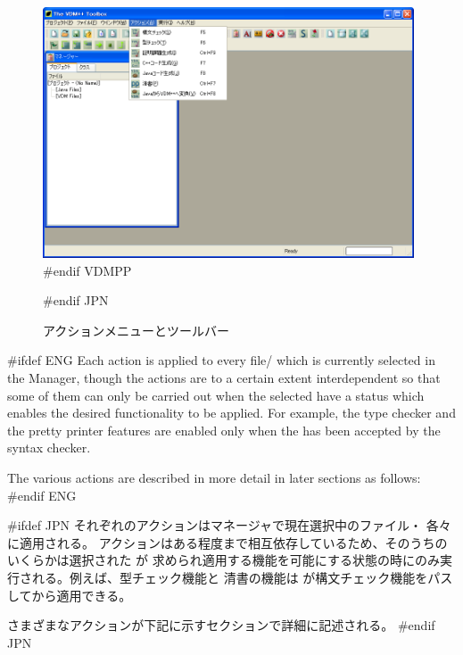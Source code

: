 \documentclass[\pformat,12pt]{article}
\newcommand{\guicmd}[1]{{\sf #1}}
\newcommand{\guicmd}[1]{{\gt #1}}
\begin{document}
\begin{figure}[tbh]
\begin{center}
\includegraphics[width=11cm]{actionsMenuToolbar-pp.png}
#endif VDMPP
\caption{アクションメニューとツールバー}
#endif JPN
\label{fig:actionsMenuToolbar}
\end{center}
\end{figure}

#ifdef ENG
Each action is applied to every
file/ which is currently
selected in the \guicmd{Manager}, though the actions are to a certain
extent interdependent so that some of them can only be carried out 
 when the selected  have
 a status which enables the desired functionality to be applied. For
 example, the type checker and the pretty printer features are 
enabled only when the  has
been accepted by the syntax checker.

The various actions are described in more detail in later sections as follows:
#endif ENG

#ifdef JPN
それぞれのアクションはマネージャで現在選択中のファイル・
 各々に適用される。
アクションはある程度まで相互依存しているため、そのうちのいくらかは選択された
  が
求められ適用する機能を可能にする状態の時にのみ実行される。例えば、型チェック機能と
清書の機能は
 が構文チェック機能をパスしてから適用できる。

さまざまなアクションが下記に示すセクションで詳細に記述される。
#endif JPN
\end{document}
